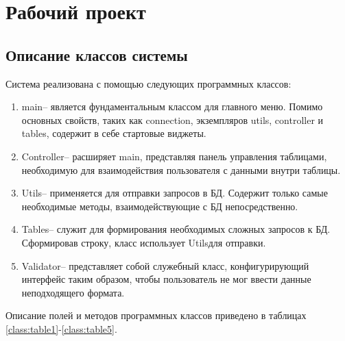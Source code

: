 \section{Рабочий проект}
\subsection{Описание классов системы}
Система реализована с помощью следующих программных классов:

\begin{enumerate}
	\item \textquotedbl main\textquotedbl -- является фундаментальным классом для главного меню. Помимо основных свойств, таких как connection, экземпляров utils, controller и tables, содержит в себе стартовые виджеты.
	\item \textquotedbl Controller\textquotedbl  --  расширяет \textquotedbl main\textquotedbl, представляя панель управления таблицами, необходимую для взаимодействия пользователя с данными внутри таблицы.
	\item \textquotedbl Utils\textquotedbl -- применяется для отправки запросов в БД. Содержит только самые необходимые методы, взаимодействующие с БД непосредственно.
	\item \textquotedbl Tables\textquotedbl -- служит для формирования необходимых сложных запросов к БД. Сформировав строку, класс использует \textquotedbl Utils\textquotedbl для отправки.
	\item \textquotedbl Validator\textquotedbl -- представляет собой служебный класс, конфигурирующий интерфейс таким образом, чтобы пользователь не мог ввести данные неподходящего формата.
\end{enumerate}

Описание полей и методов программных классов приведено в таблицах \ref{class:table1}-\ref{class:table5}.

